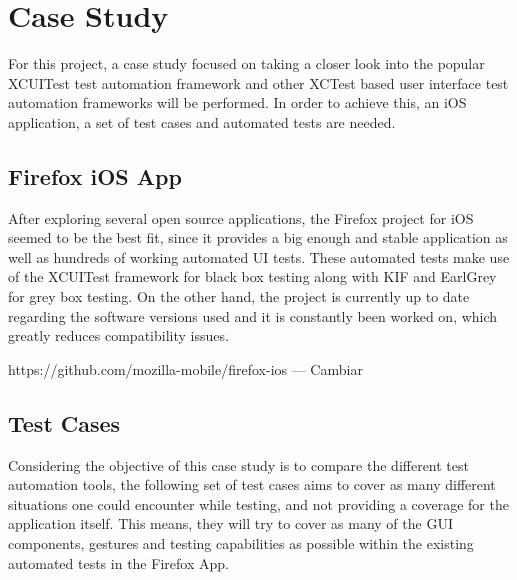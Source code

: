 \chapter{Case Study}
\label{chapter3}
For this project, a case study focused on taking a closer look into the popular XCUITest test automation framework and other XCTest based user interface test automation frameworks will be performed. In order to achieve this, an iOS application, a set of test cases and automated tests are needed.


\section{Firefox iOS App}
After exploring several open source applications, the Firefox project for iOS seemed to be the best fit, since it provides a big enough and stable application as well as hundreds of working automated UI tests. These automated tests make use of the XCUITest framework for black box testing along with KIF and EarlGrey for grey box testing. On the other hand, the project is currently up to date regarding the software versions used and it is constantly been worked on, which greatly reduces compatibility issues.

https://github.com/mozilla-mobile/firefox-ios --- Cambiar

\section{Test Cases}
Considering the objective of this case study is to compare the different test automation tools, the following set of test cases aims to cover as many different situations one could encounter while testing, and not providing a coverage for the application itself. This means, they will try to cover as many of the GUI components, gestures and testing capabilities as possible within the existing automated tests in the Firefox App.

